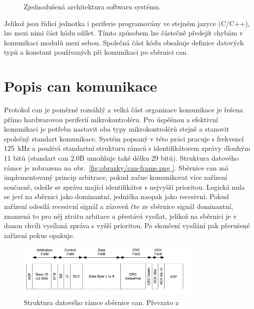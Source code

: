 \begin{figure}[h!]
        
        \caption{Zjednodušená architektura softwaru systému.}
        \label{fig:sw-blokove-schema}
    \end{figure}

    Jelikož jsou řídicí jednotka i periferie programovány ve stejném jazyce (C/C++), lze mezi nimi část kódu sdílet. Tímto způsobem lze částečně předejít chybám v komunikaci modulů mezi sebou. Společná část kódu obsahuje definice datových typů a konstant používaných při komunikaci po sběrnici \acs{can}.  

\section{Popis \acs{can} komunikace}
    Protokol \acs{can} je poměrně rozsáhlý a velká část organizace komunikace je řešena přímo hardwarovou periferií mikrokontroléru. Pro úspěšnou a efektivní komunikaci je potřeba nastavit oba typy mikrokontrolérů stejně a stanovit společný standart komunikace. Systém popsaný v této práci pracuje s frekvencí \qty{125}{kHz} a používá standartní strukturu rámců s identifikátorem zprávy dlouhým 11 bitů (standart \acs{can} 2.0B umožňuje také délku 29 bitů). Struktura datového rámce je zobrazena na obr.~\ref{fig:obrazky/can-frame.png }. Sběrnice \acs{can} má implementovaný princip arbitrace, pokud začne komunikovat více zařízení současně, odešle se zpráva mající identifikátor s nejvyšší prioritou. Logická nula se jeví na sběrnici jako dominantní, jednička naopak jako recesivní. Pokud zařízení odesílá recesivní signál a zároveň čte ze sběrnice signál dominantní, znamená to pro něj ztrátu arbitace a přestává vysílat, jelikož na sběrnici je v danou chvíli vysílaná zpráva s vyšší prioritou. Po skončení vysílání pak přerušené zařízení pokus opakuje.
    
        \begin{figure}[h!]
            \centering
            \includegraphics[width=0.8\textwidth]{obrazky/can-frame.png}
            \caption{Struktura datového rámce sběrnice \acs{can}. Převzato z~\cite{esp32-datasheet}}
            \label{fig:obrazky/can-frame.png   }
        \end{figure}
        

